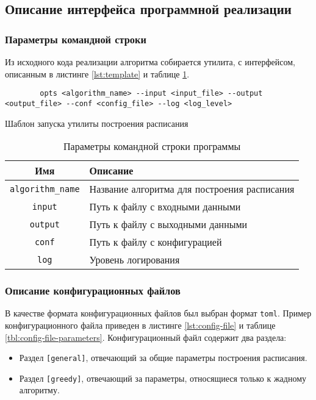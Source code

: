 \subsection{Описание интерфейса программной реализации}
\subsubsection{Параметры командной строки}
Из исходного кода реализации алгоритма собирается утилита, с интерфейсом, описанным в листинге \ref{lst:template} и таблице \ref{tbl:command-line-parameters}.
\begin{listing}[!htbp]
    \begin{verbatim}
        opts <algorithm_name> --input <input_file> --output <output_file> --conf <config_file> --log <log_level>
    \end{verbatim}
    \caption{Шаблон запуска утилиты построения расписания}
    \label{lst:template}
\end{listing}

\begin{table}[!htbp]
    \centering
    \begin{tabularx}{\textwidth}{|c|X|}
        \hline
        Имя                      & Описание                                     \\
        \hline
        \texttt{algorithm\_name} & Название алгоритма для построения расписания \\
        \hline
        \texttt{input}           & Путь к файлу с входными данными              \\
        \hline
        \texttt{output}          & Путь к файлу с выходными данными             \\
        \hline
        \texttt{conf}            & Путь к файлу с конфигурацией                 \\
        \hline
        \texttt{log}             & Уровень логирования                          \\
        \hline
    \end{tabularx}
    \caption{Параметры командной строки программы}
    \label{tbl:command-line-parameters}
\end{table}
\subsubsection{Описание конфигурационных файлов}
В качестве формата конфигурационных файлов был выбран формат \texttt{toml}. Пример конфигурационного файла приведен в листинге \ref{lst:config-file} и таблице \ref{tbl:config-file-parameters}. Конфигурационный файл содержит два раздела:
\begin{itemize}
    \item Раздел \texttt{[general]}, отвечающий за общие параметры построения расписания.
    \item Раздел \texttt{[greedy]}, отвечающий за параметры, относящиеся только к жадному алгоритму.
\end{itemize}

